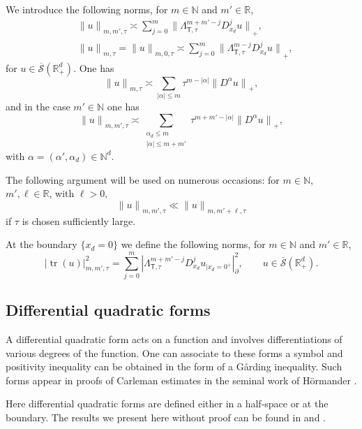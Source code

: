 \documentclass[10pt]{amsart}
\theoremstyle{plain}
\theoremstyle{definition}
\def\R{\mathbb{R}}
\def\N{\mathbb{N}}
\newcommand{\suff}{sufficiently\xspace}
\newcommand{\br}{\ensuremath{_{|x_d=0^+}}}
\newcommand{\Norm}[2]{{\| #1 \|}_{#2}}
\newcommand{\norm}[2]{{|#1|}_{#2}}
\newcommand{\Normsc}[2]{{\| #1 \|}_{#2, \tau}}
\newcommand{\normsc}[2]{{| #1 |}_{#2, \tau}}
\newcommand{\Lsct}{\Lambda_{{\scriptscriptstyle{\mathsf T}},\tau}}
\newcommand{\Sbarp}{\ensuremath{\overline{\mathscr{S}}(\Rdp)}}
\newcommand{\Rdp}{\R^d_+}
\DeclareMathOperator{\trace}{tr}
\begin{document}
We introduce the following norms, for $m\in\N$ and $m'\in\R$,
\begin{align*}
& \Normsc{u}{m,m'}
\asymp \sum_{j=0}^{m}
\Norm{\Lsct^{m+m'-j} D_{x_d}^j u}{+},\\
& \Normsc{u}{m}
=\Normsc{u}{m,0}
\asymp\sum_{j=0}^{m}
\Norm{\Lsct^{m-j} D_{x_d}^j u}{+},
\end{align*}
for $u\in\Sbarp$. One has
\begin{equation*}
\Normsc{u}{m}
\asymp
\sum_{|\alpha|\leq m}\tau^{m-|\alpha|}
\Norm{D^{\alpha}u}{+},
\end{equation*}
and in the case $m'\in\N$ one has
\begin{equation*}
\Normsc{u}{m,m'}
\asymp\sum_{\substack{\alpha_d\leq m\\ |\alpha|\leq m+m'}}
\tau^{m+m'-|\alpha|}
\Norm{D^{\alpha}u}{+},
\end{equation*}
with $\alpha=(\alpha',\alpha_d)\in\N^d$.

The following argument will be used on numerous occasions: for $m\in\N$, $m',\ell\in\R$, with $\ell>0$,
\begin{equation*}
\Normsc{u}{m,m'}
\ll \Normsc{u}{m,m'+\ell}
\end{equation*}
if $\tau $ is chosen
\suff large.

At the boundary $\{x_d=0\}$ we define the following norms, for $m\in\N$ and $m'\in\R$,
\begin{equation*}
\normsc{\trace(u)}{m,m'}^2
=\sum_{j=0}^{m}
\norm{\Lsct^{m+m'-j} D^j_{x_d}u\br}{\partial}^2,
\qquad u\in\Sbarp.
\end{equation*}

\subsection{Differential quadratic forms}
\label{sec: Differential quadratic forms}

A differential quadratic form acts on a function and involves
differentiations of various degrees of the function. One can associate
to these forms a symbol and positivity inequality can be obtained in
the form of a G{\aa}rding inequality.
Such forms appear in proofs of Carleman estimates in the seminal work
of Hörmander \cite[\S 8.2]{Hoermander:63}.

Here differential quadratic forms are
defined either in a half-space or at the boundary. The results we
present here without proof can be found in \cite{ML} and \cite{JGL-vol2}.

\end{document}

